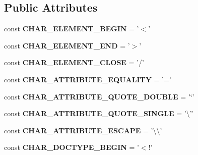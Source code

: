 \subsection*{Public Attributes}
\begin{DoxyCompactItemize}
\item 
\hypertarget{class_html_template_view_afd172c0376051ed270716ca3a4013492}{const {\bfseries C\-H\-A\-R\-\_\-\-E\-L\-E\-M\-E\-N\-T\-\_\-\-B\-E\-G\-I\-N} = '$<$'}\label{class_html_template_view_afd172c0376051ed270716ca3a4013492}

\item 
\hypertarget{class_html_template_view_ae9b5d2b9bc14a839d4820d5d49d57d8d}{const {\bfseries C\-H\-A\-R\-\_\-\-E\-L\-E\-M\-E\-N\-T\-\_\-\-E\-N\-D} = '$>$'}\label{class_html_template_view_ae9b5d2b9bc14a839d4820d5d49d57d8d}

\item 
\hypertarget{class_html_template_view_ad58393c8216a0ffde7e929834aab49ea}{const {\bfseries C\-H\-A\-R\-\_\-\-E\-L\-E\-M\-E\-N\-T\-\_\-\-C\-L\-O\-S\-E} = '/'}\label{class_html_template_view_ad58393c8216a0ffde7e929834aab49ea}

\item 
\hypertarget{class_html_template_view_a7a0f272ede711e2a5e8434444ee68633}{const {\bfseries C\-H\-A\-R\-\_\-\-A\-T\-T\-R\-I\-B\-U\-T\-E\-\_\-\-E\-Q\-U\-A\-L\-I\-T\-Y} = '='}\label{class_html_template_view_a7a0f272ede711e2a5e8434444ee68633}

\item 
\hypertarget{class_html_template_view_ae4baed2ff3fee7a9d7b43116d29db3ee}{const {\bfseries C\-H\-A\-R\-\_\-\-A\-T\-T\-R\-I\-B\-U\-T\-E\-\_\-\-Q\-U\-O\-T\-E\-\_\-\-D\-O\-U\-B\-L\-E} = '\char`\"{}'}\label{class_html_template_view_ae4baed2ff3fee7a9d7b43116d29db3ee}

\item 
\hypertarget{class_html_template_view_a7d9d19bfb7beeb7dc1359ca6f7251c4a}{const {\bfseries C\-H\-A\-R\-\_\-\-A\-T\-T\-R\-I\-B\-U\-T\-E\-\_\-\-Q\-U\-O\-T\-E\-\_\-\-S\-I\-N\-G\-L\-E} = '\textbackslash{}''}\label{class_html_template_view_a7d9d19bfb7beeb7dc1359ca6f7251c4a}

\item 
\hypertarget{class_html_template_view_a848cc6c40bd3864d316f71cd461ff95f}{const {\bfseries C\-H\-A\-R\-\_\-\-A\-T\-T\-R\-I\-B\-U\-T\-E\-\_\-\-E\-S\-C\-A\-P\-E} = '\textbackslash{}\textbackslash{}'}\label{class_html_template_view_a848cc6c40bd3864d316f71cd461ff95f}

\item 
\hypertarget{class_html_template_view_afdf08418a0f4a923436cac8643bb9454}{const {\bfseries C\-H\-A\-R\-\_\-\-D\-O\-C\-T\-Y\-P\-E\-\_\-\-B\-E\-G\-I\-N} = '$<$!'}\label{class_html_template_view_afdf08418a0f4a923436cac8643bb9454}


\end{DoxyCompactItemize}
